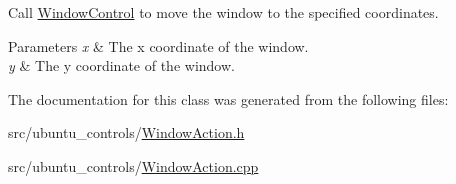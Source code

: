 Call \hyperlink{classWindowControl}{Window\+Control} to move the window to the specified coordinates.


\begin{DoxyParams}{Parameters}
{\em x} & The x coordinate of the window. \\
\hline
{\em y} & The y coordinate of the window. \\
\hline
\end{DoxyParams}


The documentation for this class was generated from the following files\+:\begin{DoxyCompactItemize}
\item 
src/ubuntu\+\_\+controls/\hyperlink{WindowAction_8h}{Window\+Action.\+h}\item 
src/ubuntu\+\_\+controls/\hyperlink{WindowAction_8cpp}{Window\+Action.\+cpp}\end{DoxyCompactItemize}
